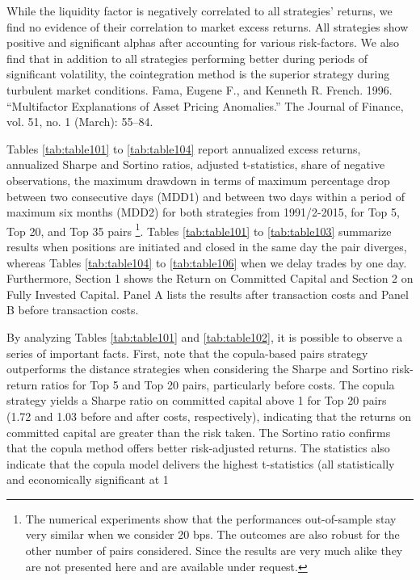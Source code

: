 \documentclass[a4paper]{article}
\begin{document}
While the liquidity factor is negatively correlated to all
strategies’ returns, we find no evidence of their correlation to market excess returns. All strategies
show positive and significant alphas after accounting for various risk-factors. We also find that in
addition to all strategies performing better during periods of significant volatility, the cointegration
method is the superior strategy during turbulent market conditions.
Fama, Eugene F., and Kenneth R. French. 1996. “Multifactor Explanations of Asset Pricing Anomalies.” The Journal of Finance, vol. 51, no. 1 (March): 55–84.

Tables \ref{tab:table101} to \ref{tab:table104} report annualized excess returns, annualized Sharpe and Sortino ratios, \citet*{nw87} adjusted t-statistics, share of negative observations, the maximum drawdown in terms of maximum percentage drop between two consecutive days (MDD1) and between two days within a period of maximum six months (MDD2) for both strategies from 1991/2-2015, for Top 5, Top 20, and Top 35 pairs \footnote{The numerical experiments show that the performances out-of-sample stay very similar when we consider 20 bps. The outcomes are also robust for the other number of pairs considered. Since the results are very much alike they are not presented here and are available under request. }. Tables \ref{tab:table101} to \ref{tab:table103} summarize results when positions are initiated and closed in the same day the pair diverges, whereas Tables \ref{tab:table104} to \ref{tab:table106} when we delay trades by one day. Furthermore, Section 1 shows the Return on Committed Capital and Section 2 on Fully Invested Capital. Panel A lists the results after transaction costs and Panel B before transaction costs. 	
	
By analyzing Tables \ref{tab:table101} and \ref{tab:table102}, it is possible to observe a series of important facts. First, note that the copula-based pairs strategy outperforms the distance strategies when considering the Sharpe and Sortino risk-return ratios for Top 5 and Top 20 pairs, particularly before costs. The copula strategy yields a Sharpe ratio on committed capital above 1 for Top 20 pairs (1.72 and 1.03 before and after costs, respectively), indicating that the returns on committed capital are greater than the risk taken. The Sortino ratio confirms that the copula method offers better risk-adjusted returns. The statistics also indicate that the copula model delivers the highest t-statistics (all statistically and economically significant at 1\\%
\end{document}
